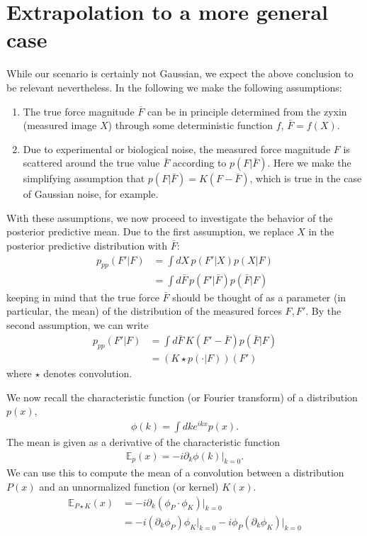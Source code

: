 \documentclass{article}
\begin{document}
\section{Extrapolation to a more general case}
While our scenario is certainly not Gaussian, we expect the above conclusion to be relevant nevertheless. 
In the following we make the following assumptions:
\begin{enumerate}
    \item The true force magnitude $\bar F$ can be in principle determined from the zyxin (measured image $X$) through some deterministic function $f$, $\bar F=f(X)$.
    \item Due to experimental or biological noise, the measured force magnitude $F$ is scattered around the true value $\bar F$ according to $p(F|\bar F)$. Here we make the simplifying assumption that $p(F|\bar F)=K(F-\bar F)$, which is true in the case of Gaussian noise, for example.
\end{enumerate}
With these assumptions, we now proceed to investigate the behavior of the posterior predictive mean.
Due to the first assumption, we replace $X$ in the posterior predictive distribution with $\bar F$:
\begin{align}
    p_{pp}(F'|F) &= \int dX\,p(F'|X)p(X|F)
    \\
    &= \int d\bar F \,p(F'|\bar F)p(\bar F|F)
\end{align}
keeping in mind that the true force $\bar F$ should be thought of as a parameter (in particular, the mean) of the distribution of the measured forces $F, F'$.
By the second assumption, we can write
\begin{align}
    p_{pp}(F'|F) &= \int d\bar F \,K(F'-\bar F)p(\bar F|F)
    \\
    &= (K \star p(\cdot|F))(F')
\end{align}
where $\star$ denotes convolution.
\par
We now recall the characteristic function (or Fourier transform) of a distribution $p(x)$, 
\begin{align*}
    \phi(k)=\int dk e^{ikx} p(x).
\end{align*}
The mean is given as a derivative of the characteristic function
\begin{align*}
    \mathbb{E}_p (x) = -i\partial_k\phi(k)\big |_{k=0}.
\end{align*}
We can use this to compute the mean of a convolution between a distribution $P(x)$ and an unnormalized function (or kernel) $K(x)$.
\begin{align*}
    \mathbb{E}_{P\star K} (x) &= -i\partial_k(\phi_P\cdot\phi_K)\big |_{k=0}
    \\
    &= -i(\partial_k\phi_P)\phi_K\big |_{k=0} -i\phi_P(\partial_k\phi_K)\big |_{k=0}
\end{align*}
\end{document}
